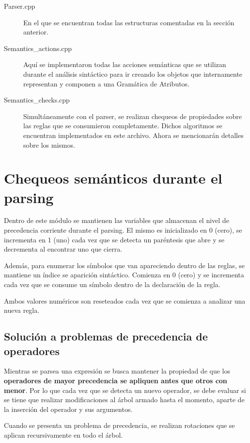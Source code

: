 \begin{description}
\item [Parser.cpp] En el que se encuentran todas las estructuras comentadas en la sección anterior.

\item [Semantics\_actions.cpp] Aquí se implementaron todas las acciones semánticas que se utilizan durante el análisis sintáctico para ir creando los objetos que internamente representan y componen a una Gramática de Atributos.

\item [Semantics\_checks.cpp] Simultáneamente con el parser, se realizan chequeos de propiedades sobre las reglas que se consumieron completamente. Dichos algoritmos se encuentran implementados en este archivo. Ahora se mencionarán detalles sobre los mismos.
\end{description}

\section{Chequeos semánticos durante el parsing}

Dentro de este módulo se mantienen las variables que almacenan el nivel de precedencia corriente durante el parsing. El mismo es inicializado en 0 (cero), se incrementa en 1 (uno) cada vez que se detecta un paréntesis que abre y se decrementa al encontrar uno que cierra.

Además, para enumerar los símbolos que van apareciendo dentro de las reglas, se mantiene un índice se aparición sintáctico. Comienza en 0 (cero) y se incrementa cada vez que se consume un símbolo dentro de la declaración de la regla.

Ambos valores numéricos son reseteados cada vez que se comienza a analizar una nueva regla.

\subsection{Solución a problemas de precedencia de operadores}

Mientras se parsea una expresión se busca mantener la propiedad de que los \textbf{operadores de mayor precedencia se apliquen antes que otros con menor}. Por lo que cada vez que se detecta un nuevo operador, se debe evaluar si se tiene que realizar modificaciones al árbol armado hasta el momento, aparte de la inserción del operador y sus argumentos.

Cuando se presenta un problema de precedencia, se realizan rotaciones que se aplican recursivamente en todo el árbol. 

